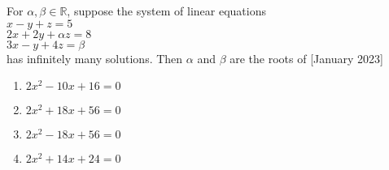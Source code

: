     \item For $\alpha, \beta \in \mathbb{R}$, suppose the system of linear equations\\$x - y + z = 5$\\ $2x + 2y + \alpha z = 8$\\ $3x - y + 4z = \beta$\\ has infinitely many solutions. Then $\alpha$ and $\beta$ are the roots of
    \hfill{[January 2023]}
    \begin{enumerate}
        \item $2x^2 - 10x + 16 = 0$
        \item $2x^2 + 18x + 56 = 0$
        \item $2x^2 - 18x + 56 = 0$
        \item $2x^2 + 14x + 24 = 0$
    \end{enumerate}
    


